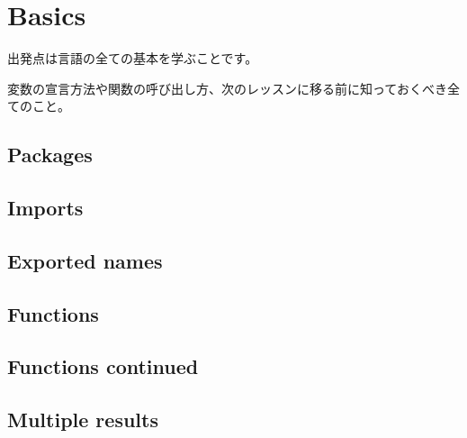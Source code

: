 \section{Basics}

出発点は言語の全ての基本を学ぶことです。

変数の宣言方法や関数の呼び出し方、次のレッスンに移る前に知っておくべき全てのこと。

\subsection{Packages}





\subsection{Imports}





\subsection{Exported names}





\subsection{Functions}





\subsection{Functions continued}





\subsection{Multiple results}





